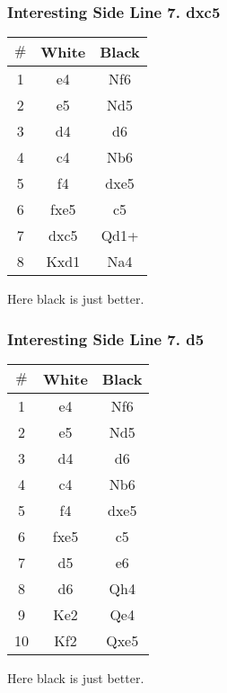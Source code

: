 \documentclass{article}
\newcommand{\smalls}{\par\smallskip}
\begin{document}
        \subsubsection*{Interesting Side Line 7. dxc5}
        \begin{multicols}{2}
            \showboard
            \smalls
            \begin{tabular}{c|c|c}
                $\#$ & White & Black\\
                \hline
                1 & e4 & Nf6 \\
                2 & e5 & Nd5 \\
                3 & d4 & d6 \\
                4 & c4 & Nb6 \\
                5 & f4 & dxe5 \\
                6 & fxe5 & c5 \\
                7 & dxc5 & Qd1+ \\
                8 & Kxd1 & Na4 \\
            \end{tabular}
        \end{multicols}
        Here black is just better.
        \smalls
        \newpage

        \subsubsection*{Interesting Side Line 7. d5}
        \begin{multicols}{2}
            \showboard
            \smalls
            \begin{tabular}{c|c|c}
                $\#$ & White & Black\\
                \hline
                1 & e4 & Nf6 \\
                2 & e5 & Nd5 \\
                3 & d4 & d6 \\
                4 & c4 & Nb6 \\
                5 & f4 & dxe5 \\
                6 & fxe5 & c5 \\
                7 & d5 & e6 \\
                8 & d6 & Qh4 \\
                9 & Ke2 & Qe4 \\
                10 & Kf2 & Qxe5 \\
            \end{tabular}
        \end{multicols}
        Here black is just better.
\end{document}
